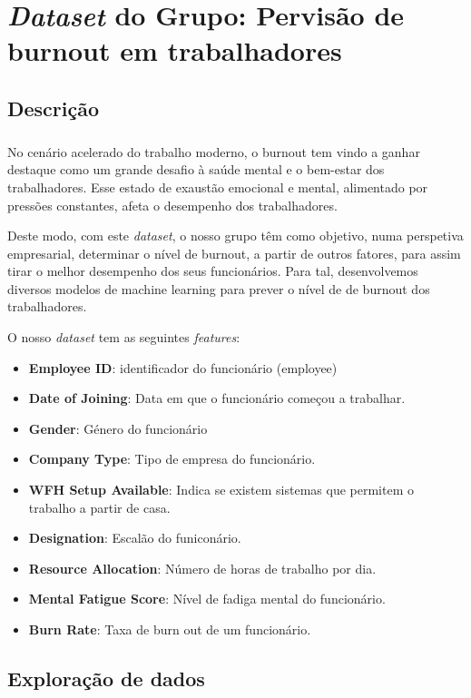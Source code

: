 \chapter{\textit{Dataset} do Grupo: Pervisão de burnout em trabalhadores}

\section{Descrição}
\paragraph{}
No cenário acelerado do trabalho moderno, o burnout tem vindo a ganhar destaque como um grande desafio à saúde mental e o bem-estar dos trabalhadores. Esse estado de exaustão emocional e mental, alimentado por pressões constantes, afeta o desempenho dos trabalhadores.

Deste modo, com este \textit{dataset}, o nosso grupo têm como objetivo, numa perspetiva empresarial, determinar o nível de burnout, a partir de outros fatores, para assim tirar o melhor desempenho dos seus funcionários. Para tal, desenvolvemos diversos modelos de machine learning para prever o nível de de burnout dos trabalhadores.

O nosso \textit{dataset} tem as seguintes \textit{features}:
\begin{itemize}
    \item \textbf{Employee ID}: identificador do funcionário (employee)
    \item \textbf{Date of Joining}: Data em que o funcionário começou a trabalhar.
    \item \textbf{Gender}: Género do funcionário
    \item \textbf{Company Type}: Tipo de empresa do funcionário.
    \item \textbf{WFH Setup Available}: Indica se existem sistemas que permitem o trabalho a partir de casa.
    \item \textbf{Designation}: Escalão do funiconário.
    \item \textbf{Resource Allocation}: Número de horas de trabalho por dia.
    \item \textbf{Mental Fatigue Score}: Nível de fadiga mental do funcionário.
    \item \textbf{Burn Rate}: Taxa de burn out de um funcionário.
\end{itemize}

\section{Exploração de dados}
